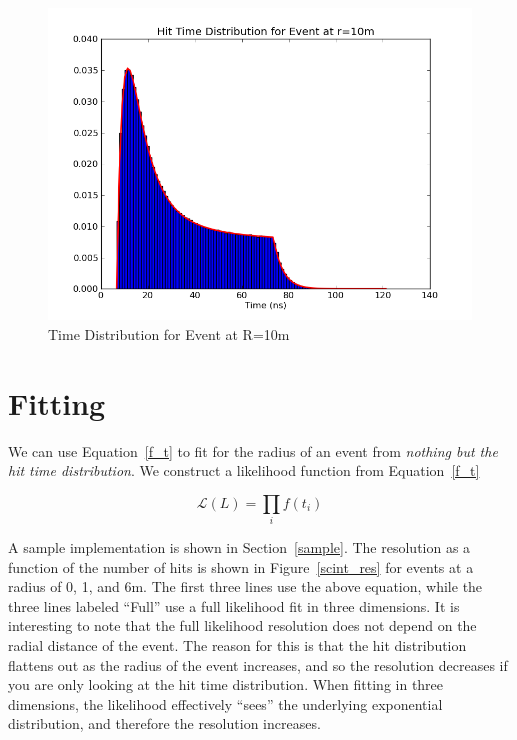 \documentclass{article}
\newcommand{\like}{\mathscr{L}}
\begin{document}
\begin{figure}[h!]
    \centering
    \includegraphics[width=0.75\linewidth]{hit_time_10.png}
    \caption{Time Distribution for Event at R=10m}
    \label{hit_time_10}
\end{figure}

\section{Fitting}
We can use Equation~\ref{f_t} to fit for the radius of an event from
\emph{nothing but the hit time distribution}. We construct a likelihood
function from Equation~\ref{f_t}

\[
    \like(L) = \prod_i f(t_i)
\]

A sample implementation is shown in Section~\ref{sample}. The resolution
as a function of the number of hits is shown in Figure~\ref{scint_res}
for events at a radius of 0, 1, and 6m. The first three lines use the above
equation, while the three lines labeled ``Full'' use a full likelihood fit in
three dimensions. It is interesting to note that the full likelihood resolution
does not depend on the radial distance of the event.  The reason for this is
that the hit distribution flattens out as the radius of the event increases,
and so the resolution decreases if you are only looking at the hit time
distribution. When fitting in three dimensions, the likelihood effectively
``sees'' the underlying exponential distribution, and therefore the resolution
increases.
\end{document}
